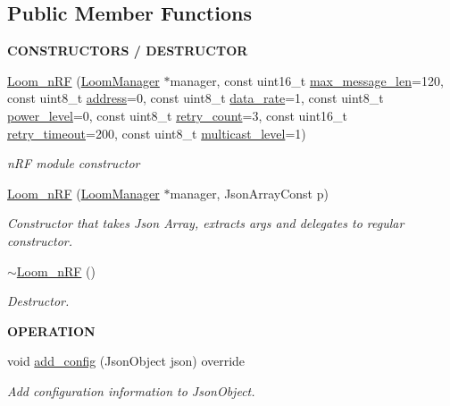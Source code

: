 \subsection*{Public Member Functions}
\begin{Indent}{\bf C\+O\+N\+S\+T\+R\+U\+C\+T\+O\+RS / D\+E\+S\+T\+R\+U\+C\+T\+OR}\par
\begin{DoxyCompactItemize}
\item 
\hyperlink{class_loom__n_r_f_a54c70e58ccff14396a880199365da651}{Loom\+\_\+n\+RF} (\hyperlink{class_loom_manager}{Loom\+Manager} $\ast$manager, const uint16\+\_\+t \hyperlink{class_loom_comm_plat_a2b4f69c2ec15028f5f281c3d1d399dba}{max\+\_\+message\+\_\+len}=120, const uint8\+\_\+t \hyperlink{class_loom__n_r_f_a9bd096cf262ff923c4ba8e8cbd85d63b}{address}=0, const uint8\+\_\+t \hyperlink{class_loom__n_r_f_aa07c72a33cf70c119ff333b3177aadd0}{data\+\_\+rate}=1, const uint8\+\_\+t \hyperlink{class_loom__n_r_f_a47eb5605398f1d83febef1c0ec3ef27b}{power\+\_\+level}=0, const uint8\+\_\+t \hyperlink{class_loom__n_r_f_a53c54395b6ac8e89b8c3a0b3d582a9fe}{retry\+\_\+count}=3, const uint16\+\_\+t \hyperlink{class_loom__n_r_f_a57f2765c35a200cf53ad055f5e1bef13}{retry\+\_\+timeout}=200, const uint8\+\_\+t \hyperlink{class_loom__n_r_f_a91e29e17ba984dc899ca11507adfd9f9}{multicast\+\_\+level}=1)
\begin{DoxyCompactList}\small\item\em n\+RF module constructor \end{DoxyCompactList}\item 
\hyperlink{class_loom__n_r_f_a0bb645a077a48e550bc3d7e669e60f42}{Loom\+\_\+n\+RF} (\hyperlink{class_loom_manager}{Loom\+Manager} $\ast$manager, Json\+Array\+Const p)
\begin{DoxyCompactList}\small\item\em Constructor that takes Json Array, extracts args and delegates to regular constructor. \end{DoxyCompactList}\item 
\hyperlink{class_loom__n_r_f_a8e09b1bbacd10cdaca78d952a8a80930}{$\sim$\+Loom\+\_\+n\+RF} ()
\begin{DoxyCompactList}\small\item\em Destructor. \end{DoxyCompactList}\end{DoxyCompactItemize}
\end{Indent}
\begin{Indent}{\bf O\+P\+E\+R\+A\+T\+I\+ON}\par
\begin{DoxyCompactItemize}
\item 
void \hyperlink{class_loom__n_r_f_a17b192fceeb84d4da70c3213ea743228}{add\+\_\+config} (Json\+Object json) override
\begin{DoxyCompactList}\small\item\em Add configuration information to Json\+Object. \end{DoxyCompactList}\end{DoxyCompactItemize}
\end{Indent}
